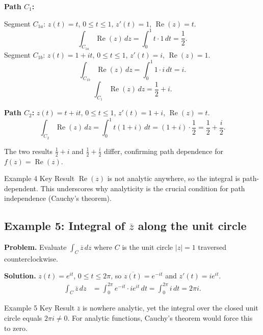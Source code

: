 \documentclass[12pt,a4paper]{article}
\begin{document}
\textbf{Path $C_1$:}

Segment $C_{1a}$: $z(t) = t$, $0 \le t \le 1$, $z'(t)=1$,
$\operatorname{Re}(z)=t$.
\[
  \int_{C_{1a}} \operatorname{Re}(z)\,dz = \int_0^1 t \cdot 1\,dt = \frac{1}{2}.
\]
Segment $C_{1b}$: $z(t) = 1 + it$, $0 \le t \le 1$, $z'(t) = i$,
$\operatorname{Re}(z) = 1$.
\[
  \int_{C_{1b}} \operatorname{Re}(z)\,dz = \int_0^1 1 \cdot i\,dt = i.
\]
\[
  \int_{C_1} \operatorname{Re}(z)\,dz = \frac{1}{2} + i.
\]

\textbf{Path $C_2$:} $z(t) = t + it$, $0 \le t \le 1$, $z'(t) = 1+i$,
$\operatorname{Re}(z) = t$.
\[
  \int_{C_2} \operatorname{Re}(z)\,dz
  = \int_0^1 t(1+i)\,dt = (1+i)\cdot\frac{1}{2} = \frac{1}{2} + \frac{i}{2}.
\]

The two results $\frac{1}{2}+i$ and $\frac{1}{2}+\frac{i}{2}$ differ,
confirming path dependence for $f(z) = \operatorname{Re}(z)$.

\begin{learnbox}{Example 4 Key Result}
$\operatorname{Re}(z)$ is not analytic anywhere, so the integral is
path-dependent. This underscores why analyticity is the crucial condition for
path independence (Cauchy's theorem).
\end{learnbox}

\subsection*{Example 5: Integral of $\overline{z}$ along the unit circle}

\textbf{Problem.} Evaluate $\displaystyle\int_C \overline{z}\,dz$ where $C$
is the unit circle $|z|=1$ traversed counterclockwise.

\textbf{Solution.}
$z(t) = e^{it}$, $0 \le t \le 2\pi$, so $\overline{z(t)} = e^{-it}$ and
$z'(t) = ie^{it}$.
\begin{align*}
  \int_C \overline{z}\,dz
  &= \int_0^{2\pi} e^{-it} \cdot ie^{it}\,dt
   = \int_0^{2\pi} i\,dt
   = 2\pi i.
\end{align*}

\begin{learnbox}{Example 5 Key Result}
$\overline{z}$ is nowhere analytic, yet the integral over the closed unit
circle equals $2\pi i \ne 0$. For analytic functions, Cauchy's theorem would
force this to zero.
\end{learnbox}

\end{document}

